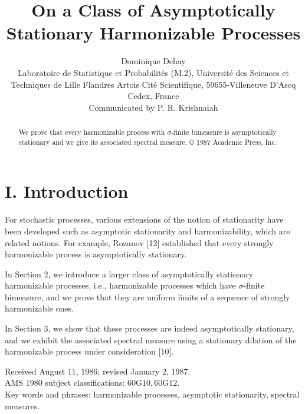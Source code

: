 \documentclass{article}
\begin{document}
\title{
On a Class of Asymptotically Stationary Harmonizable Processes
}

\author{
Dominique Dehay \\ Laboratoire de Statistique et Probabilités (M.2), Université des Sciences et Techniques de Lille Flandres Artois Cité Scientifique, 59655-Villeneuve D'Ascq Cedex, France \\ Communicated by P. R. Krishnaiah
}

\date{} %

\maketitle %

\begin{abstract}
We prove that every harmonizable process with \(\sigma\)-finite bimeasure is asymptotically stationary and we give its associated spectral measure. © 1987 Academic Press, Inc.
\end{abstract}

\section*{I. Introduction}

For stochastic processes, various extensions of the notion of stationarity have been developed such as asymptotic stationarity and harmonizability, which are related notions. For example, Rozanov [12] established that every strongly harmonizable process is asymptotically stationary.

In Section 2, we introduce a larger class of asymptotically stationary harmonizable processes, i.e., harmonizable processes which have \(\sigma\)-finite bimeasure, and we prove that they are uniform limits of a sequence of strongly harmonizable ones.

In Section 3, we show that these processes are indeed asymptotically stationary, and we exhibit the associated spectral measure using a stationary dilation of the harmonizable process under consideration [10].

{
\small %
\par\noindent %
Received August 11, 1986; revised January 2, 1987. \\
AMS 1980 subject classifications: \(60 \mathrm{G} 10, 60 \mathrm{G} 12\). \\
Key words and phrases: harmonizable processes, asymptotic stationarity, spectral measures.
\par
}
\vspace{\baselineskip} %
\end{document}
